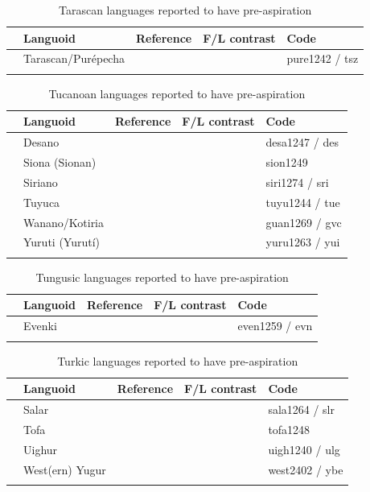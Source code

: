 \documentclass[output=paper]{langscibook}
\begin{document}
\begin{paperappendix}
\begin{table}
\begin{tabularx}{\textwidth}{@{}l@{}QQQl}
\lsptoprule
& Languoid & Reference & F/L contrast & Code\\
\midrule
  & Tarascan/Purépecha & \citet{Silverman2003} &  & pure1242 / tsz\\
\lspbottomrule
\end{tabularx}
\caption{Tarascan languages reported to have pre-aspiration}
\label{tab:key:11}
\end{table}


\begin{table}
\begin{tabularx}{\textwidth}{@{}l@{}QQQl}
\lsptoprule
& Languoid & Reference & F/L contrast & Code\\
\midrule
  & Desano & \citet[51]{Stenzel2004} &  & desa1247 / des\\
& Siona (Sionan) & \citet{chapters/18_vantveer} &  & sion1249\\
& Siriano & \citet[51]{Stenzel2004} &  & siri1274 / sri\\
& Tuyuca & \citet[51]{Stenzel2004} &  & tuyu1244 / tue\\
& Wanano/Kotiria & \citet[51]{Stenzel2004} & \citet[50-51]{Stenzel2004} & guan1269 / gvc\\
& Yuruti (Yurutí) & \citet{chapters/18_vantveer}  &  & yuru1263 / yui\\
\lspbottomrule
\end{tabularx}
\caption{Tucanoan languages reported to have pre-aspiration}
\label{tab:key:12}
\end{table}


\begin{table}
\begin{tabularx}{\textwidth}{@{}l@{}QQQl}
\lsptoprule
& Languoid & Reference & F/L contrast & Code\\
\midrule
  & Evenki & \citet{KarlssonSvantesson2012} &  & even1259 / evn\\
\lspbottomrule
\end{tabularx}
\caption{Tungusic languages reported to have pre-aspiration}
\label{tab:key:13}
\end{table}


\begin{table}
\begin{tabularx}{\textwidth}{@{}l@{}QQQl}
\lsptoprule
& Languoid & Reference & F/L contrast & Code\\
\midrule
  & Salar & \citet{Dwyer2000} &  & sala1264 / slr\\
& Tofa & \citet{Roos1998} &  & tofa1248\\
& Uighur & \citet{Dwyer2000} &  & uigh1240 / ulg\\
& West(ern) Yugur & \citet{Roos1998} &  & west2402 / ybe\\
\lspbottomrule
\end{tabularx}
\caption{Turkic languages reported to have pre-aspiration}
\label{tab:key:14}
\end{table}



\end{paperappendix}
\end{document}
